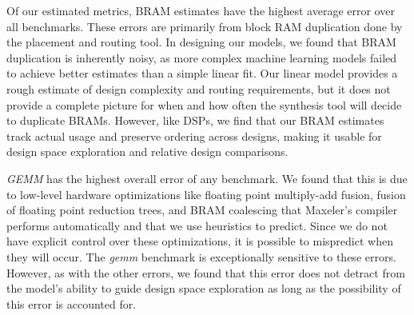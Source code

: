 Of our estimated metrics, BRAM estimates have the highest average error over all benchmarks. These errors are primarily from block RAM duplication done by the placement and routing tool. In designing our models, we found that BRAM duplication is inherently noisy, as more complex machine learning models failed to achieve better estimates than a simple linear fit. Our linear model provides a rough estimate of design complexity and routing requirements, but it does not provide a complete picture for when and how often the synthesis tool will decide to duplicate BRAMs. However, like DSPs, we find that our BRAM estimates track actual usage and preserve ordering across designs, making it usable for design space exploration and relative design comparisons.

\emph{GEMM} has the highest overall error of any benchmark. We found that this is due to low-level hardware optimizations like floating point multiply-add fusion, fusion of floating point reduction trees, and BRAM coalescing that Maxeler's compiler performs automatically and that we use heuristics to predict. Since we do not have explicit control over these optimizations, it is possible to mispredict when they will occur. The \emph{gemm} benchmark is exceptionally sensitive to these errors. However, as with the other errors, we found that this error does not detract from the model's ability to guide design space exploration as long as the possibility of this error is accounted for.


